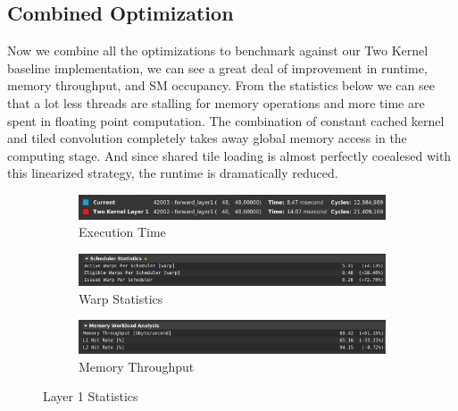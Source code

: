 \documentclass{article}
\begin{document}
\subsection{Combined Optimization}
Now we combine all the optimizations to benchmark against our Two Kernel baseline
implementation, we can see a great deal of improvement in runtime, memory throughput,
and SM occupancy. From the statistics below we can see that a lot less threads
are stalling for memory operations and more time are spent in floating point
computation. The combination of constant cached kernel and tiled convolution
completely takes away global memory access in the computing stage. And since shared
tile loading is almost perfectly coealesed with this linearized strategy, the
runtime is dramatically reduced.

\begin{figure}[H]
    \centering
    \begin{subfigure}[b]{\linewidth}
        \includegraphics[width=\linewidth]{ms4_layer1_runtime}
        \caption{Execution Time}
    \end{subfigure}
    \begin{subfigure}[b]{\linewidth}
        \includegraphics[width=\linewidth]{ms4_layer1_warp}
        \caption{Warp Statistics}
    \end{subfigure}
    \begin{subfigure}[b]{\linewidth}
        \includegraphics[width=\linewidth]{ms4_layer1_mem}
        \caption{Memory Throughput}
    \end{subfigure}
    \caption{Layer 1 Statistics}
\end{figure}
\end{document}

